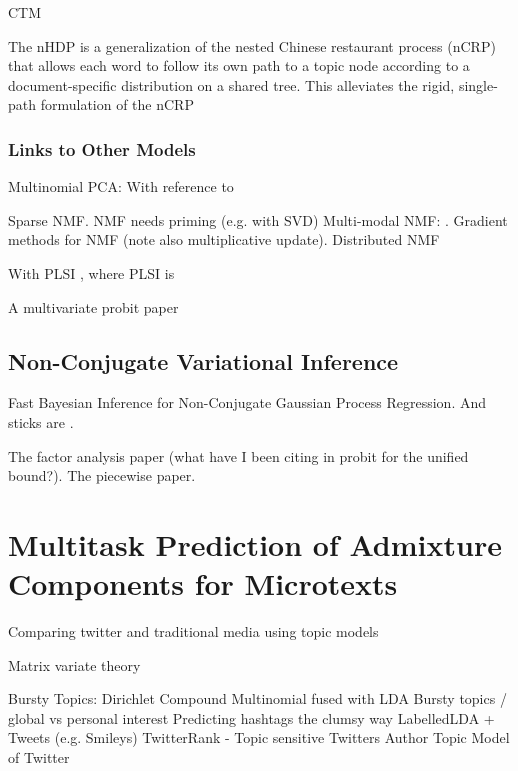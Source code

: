 \documentclass[10pt,fleqn]{article}
\begin{document}
CTM\cite{Paisley2012}

The nHDP is a generalization of the nested Chinese restaurant process (nCRP) that allows each word to follow its own path to a topic node according to a document-specific distribution on a shared tree. This alleviates the rigid, single-path formulation of the nCRP \cite{Paisley2012a}

\subsubsection{Links to Other Models}

Multinomial PCA: \cite{Buntine2002} With reference to \cite{Rubin2011}

Sparse NMF\cite{Hoyer2004}. NMF needs priming (e.g. with SVD) \cite{Boutsidis2008}
Multi-modal NMF: \cite{Bouchard2012}. Gradient methods for NMF (note also multiplicative update)\cite{Lin2007}. Distributed NMF\cite{Liu2010}

With PLSI \cite{GiKa2003}, where PLSI is\cite{Hofmann1999}

A multivariate probit paper \cite{Talhouk2011}

\subsection{Non-Conjugate Variational Inference}

Fast Bayesian Inference for Non-Conjugate Gaussian Process Regression\cite{Khan2012fastbayes}. And sticks are \cite{Khan2012stick}.

The factor analysis paper (what have I been citing in probit for the unified bound?)\cite{Khan}. The piecewise paper\cite{Marlin2011}.


\section{Multitask Prediction of Admixture Components for Microtexts}

Comparing twitter and traditional media using topic models\cite{Zhao2011}

Matrix variate theory \cite{Dawid1981}

Bursty Topics: Dirichlet Compound Multinomial fused with LDA \cite{Doyle2009}
Bursty topics / global vs personal interest \cite{Diao2010}
Predicting hashtags the clumsy way\cite{Preot2012}
LabelledLDA + Tweets (e.g. Smileys)\cite{Ramage2010}
TwitterRank - Topic sensitive Twitters\cite{Weng2010}
Author Topic Model of Twitter\cite{Xu2011}



\end{document}
